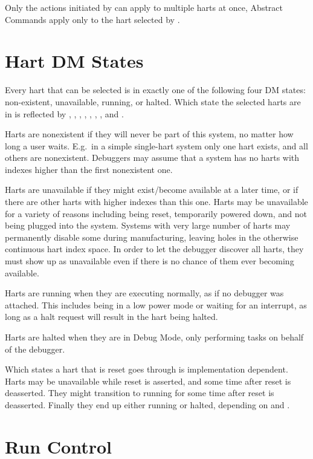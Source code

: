 Only the actions initiated by \RdmDmcontrol can apply to multiple harts
at once, Abstract Commands apply only to the hart selected by
\Fhartsel.

\section{Hart DM States}

Every hart that can be selected is in exactly one of the following four DM states:
non-existent, unavailable, running, or halted. Which state
the selected harts are in is reflected by \FdmDmstatusAllnonexistent,
\FdmDmstatusAnynonexistent, \FdmDmstatusAllunavail, \FdmDmstatusAnyunavail,
\FdmDmstatusAllrunning, \FdmDmstatusAnyrunning, \FdmDmstatusAllhalted, and
\FdmDmstatusAnyhalted.

Harts are nonexistent if they will never be part of this system, no matter how
long a user waits. E.g.\ in a simple single-hart system only one hart exists,
and all others are nonexistent. Debuggers may assume that a system has no harts
with indexes higher than the first nonexistent one.

Harts are unavailable if they might exist/become available at a later time, or
if there are other harts with higher indexes than this one. Harts may be
unavailable for a variety of reasons including being reset, temporarily powered
down, and not being plugged into the system.
Systems with very large number of harts may
permanently disable some during manufacturing, leaving holes in the otherwise
continuous hart index space. In order to let the debugger discover all harts,
they must show up as unavailable even if there is no chance of them ever
becoming available.

Harts are running when they are executing normally, as if no debugger was
attached. This includes being in a low power mode or waiting for an interrupt,
as long as a halt request will result in the hart being halted.

Harts are halted when they are in Debug Mode, only performing tasks on behalf
of the debugger.

Which states a hart that is reset goes through is implementation dependent.
Harts may be unavailable while reset is asserted, and some time after reset is
deasserted. They might transition to running for some time after reset is
deasserted. Finally they end up either running or halted, depending on
\FdmDmcontrolHaltreq and \Fresethaltreq.

\section{Run Control} \label{runcontrol}

